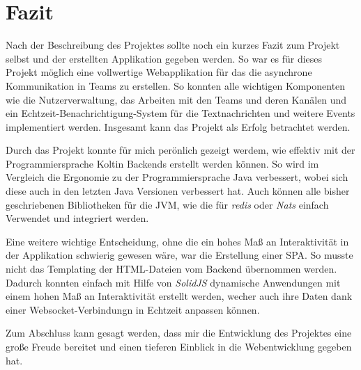 \chapter{Fazit}

Nach der Beschreibung des Projektes sollte noch ein kurzes Fazit zum Projekt
selbst und der erstellten Applikation gegeben werden. So war es für dieses
Projekt möglich eine vollwertige Webapplikation für das die asynchrone Kommunikation
in Teams zu erstellen. So konnten alle wichtigen Komponenten wie die Nutzerverwaltung,
das Arbeiten mit den Teams und deren Kanälen und ein Echtzeit-Benachrichtigung-System
für die Textnachrichten und weitere Events implementiert werden. Insgesamt kann das
Projekt als Erfolg betrachtet werden.

Durch das Projekt konnte für mich perönlich gezeigt werdem, wie effektiv mit der
Programmiersprache Koltin Backends erstellt werden können. So wird im Vergleich
die Ergonomie zu der Programmiersprache Java verbessert, wobei sich diese auch in den
letzten Java Versionen verbessert hat. Auch können alle bisher geschriebenen Bibliotheken
für die JVM, wie \zb{} die für \emph{redis} oder \emph{Nats} einfach Verwendet und
integriert werden.

Eine weitere wichtige Entscheidung, ohne die ein hohes Maß an Interaktivität in
der Applikation schwierig gewesen wäre, war die Erstellung einer SPA. So musste
nicht das Templating der HTML-Dateien vom Backend übernommen werden. Dadurch
konnten einfach mit Hilfe von \emph{SolidJS} dynamische Anwendungen mit einem
hohen Maß an Interaktivität erstellt werden, wecher auch ihre Daten dank einer
Websocket-Verbindungn in Echtzeit anpassen können.

Zum Abschluss kann gesagt werden, dass mir die Entwicklung des Projektes eine
große Freude bereitet und einen tieferen Einblick in die Webentwicklung gegeben
hat.
